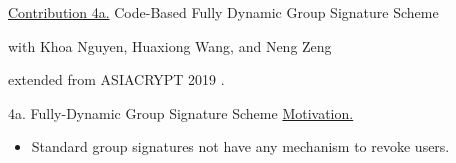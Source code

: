 \begin{frame}{}
	\underline{Contribution 4a.} Code-Based Fully Dynamic Group Signature Scheme
	
	{\small with Khoa Nguyen, Huaxiong Wang, and Neng Zeng}
	
	extended from ASIACRYPT 2019 \cite{NguyenTWZ19}.
\end{frame}

\begin{frame}{4a. Fully-Dynamic Group Signature Scheme}
	\underline{Motivation.}
	\begin{itemize}
		\item Standard group signatures not have any mechanism to revoke users.
	\end{itemize}
\end{frame}